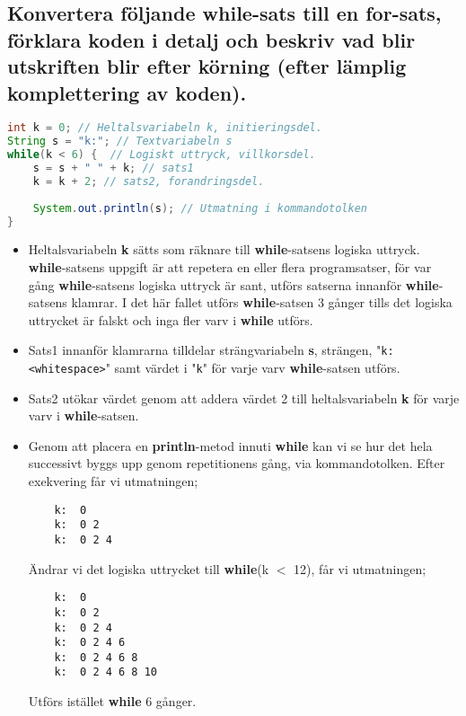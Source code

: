 \documentclass[../main.tex]{subfiles}
\begin{document}
\subsection{Konvertera följande while-sats till en for-sats, förklara koden i detalj
och beskriv vad blir utskriften blir efter körning (efter lämplig komplettering av koden).}

\begin{lstlisting}[language=java]
int k = 0; // Heltalsvariabeln k, initieringsdel.
String s = "k:"; // Textvariabeln s 
while(k < 6) {  // Logiskt uttryck, villkorsdel.
    s = s + " " + k; // sats1
    k = k + 2; // sats2, forandringsdel.
    
    System.out.println(s); // Utmatning i kommandotolken
}
\end{lstlisting}
\begin{itemize}
    \item Heltalsvariabeln \textbf{k}
    sätts som räknare till \textbf{while}-satsens logiska uttryck. \textbf{while}-satsens uppgift är att repetera en eller flera programsatser, för var gång \textbf{while}-satsens logiska uttryck är sant, utförs satserna innanför \textbf{while}-satsens klamrar. I det här fallet utförs \textbf{while}-satsen 3 gånger tills det logiska uttrycket är falskt och inga fler varv i \textbf{while} utförs.
    
    \item Sats1 innanför klamrarna tilldelar strängvariabeln \textbf{s}, strängen, "\texttt{k: <whitespace>}" samt värdet i "\texttt{k}" för varje varv \textbf{while}-satsen utförs.
    
    \item Sats2 utökar värdet genom att addera värdet 2 till heltalsvariabeln \textbf{k} för varje varv i \textbf{while}-satsen.
    
    \item Genom att placera en \textbf{println}-metod innuti \textbf{while} kan vi se hur det hela successivt byggs upp genom repetitionens gång, via kommandotolken. Efter exekvering får vi utmatningen;
    
    \begin{lstlisting}
    k:  0
    k:  0 2
    k:  0 2 4
    \end{lstlisting}
    Ändrar vi det logiska uttrycket till \textbf{while}(k $<$ 12), får vi utmatningen;
    \begin{lstlisting}
    k:  0
    k:  0 2
    k:  0 2 4
    k:  0 2 4 6
    k:  0 2 4 6 8
    k:  0 2 4 6 8 10
    \end{lstlisting}
    Utförs istället \textbf{while} 6 gånger.
\end{itemize}
\newpage
\end{document}
